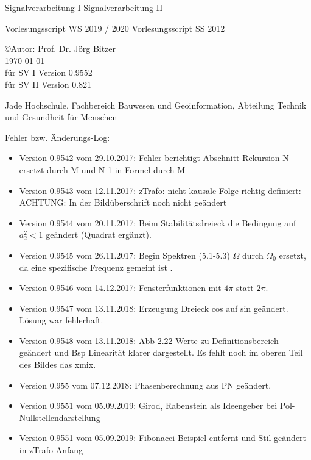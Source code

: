 \begin{titlepage}
\vfill
\begin{center}
{\huge

\vspace*{0.5cm}
{Signalverarbeitung I}
{Signalverarbeitung II}
}

\vspace*{2cm}
{{\large Vorlesungsscript WS 2019 / 2020 }}
{{\large Vorlesungsscript SS 2012}}

\vfill


{\copyright Autor: Prof. Dr. Jörg Bitzer \\ \today \\ 
{{für SV I Version 0.9552 \\}}{{ für SV II  Version 0.821}}}

Jade Hochschule, Fachbereich Bauwesen und Geoinformation, Abteilung Technik und Gesundheit für Menschen 

\end{center}
Fehler bzw. Änderungs-Log:
\begin{itemize}
	\item Version 0.9542 vom 29.10.2017: Fehler berichtigt Abschnitt Rekursion N ersetzt durch M und N-1 in Formel durch M
	\item Version 0.9543 vom 12.11.2017: zTrafo: nicht-kausale Folge richtig definiert: ACHTUNG: In der Bildüberschrift noch nicht geändert
	\item Version 0.9544 vom 20.11.2017: Beim Stabilitätsdreieck die Bedingung auf $a_2^2 <1$ geändert (Quadrat ergänzt).
	\item Version 0.9545 vom 26.11.2017: Begin Spektren (5.1-5.3) $\Omega$ durch $\Omega_0$ ersetzt, da eine spezifische Frequenz gemeint ist .
	\item Version 0.9546 vom 14.12.2017: Fensterfunktionen mit $4\pi$ statt $2\pi$.
	\item Version 0.9547 vom 13.11.2018: Erzeugung Dreieck cos auf sin geändert. Lösung war fehlerhaft.
	\item Version 0.9548 vom 13.11.2018: Abb 2.22 Werte zu Definitionsbereich geändert und Bsp Linearität klarer dargestellt. Es fehlt noch im oberen Teil des Bildes das xmix.
	\item Version 0.955 vom 07.12.2018: Phasenberechnung aus PN geändert.
	\item Version 0.9551 vom 05.09.2019: Girod, Rabenstein als Ideengeber bei Pol-Nullstellendarstellung 
	\item Version 0.9551 vom 05.09.2019: Fibonacci Beispiel entfernt und Stil geändert in zTrafo Anfang
\end{itemize}



\end{titlepage}
